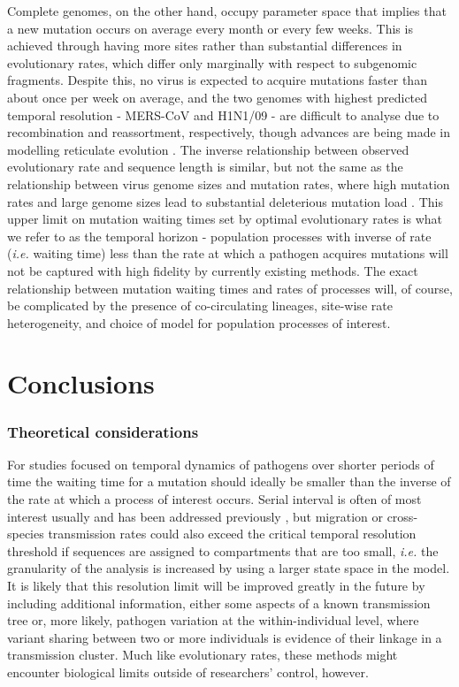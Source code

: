 \documentclass[11pt,oneside,letterpaper]{article}
\begin{document}
Complete genomes, on the other hand, occupy parameter space that implies that a new mutation occurs on average every month or every few weeks.
This is achieved through having more sites rather than substantial differences in evolutionary rates, which differ only marginally with respect to subgenomic fragments.
Despite this, no virus is expected to acquire mutations faster than about once per week on average, and the two genomes with highest predicted temporal resolution - MERS-CoV and H1N1/09 - are difficult to analyse due to recombination and reassortment, respectively, though advances are being made in modelling reticulate evolution \citep{vaughan_inferring_2017}.
The inverse relationship between observed evolutionary rate and sequence length is similar, but not the same as the relationship between virus genome sizes and mutation rates, where high mutation rates and large genome sizes lead to substantial deleterious mutation load \citep{pybus_phylogenetic_2007,gago_extremely_2009}.
This upper limit on mutation waiting times set by optimal evolutionary rates is what we refer to as the temporal horizon - population processes with inverse of rate (\textit{i.e.} waiting time) less than the rate at which a pathogen acquires mutations will not be captured with high fidelity by currently existing methods.
The exact relationship between mutation waiting times and rates of processes will, of course, be complicated by the presence of co-circulating lineages, site-wise rate heterogeneity, and choice of model for population processes of interest.

\section*{Conclusions}
\subsubsection*{Theoretical considerations}
For studies focused on temporal dynamics of pathogens over shorter periods of time the waiting time for a mutation should ideally be smaller than the inverse of the rate at which a process of interest occurs.
Serial interval is often of most interest usually and has been addressed previously \citep{campbell_when_2018,grubaugh_tracking_2019}, but migration or cross-species transmission rates could also exceed the critical temporal resolution threshold if sequences are assigned to compartments that are too small, \textit{i.e.} the granularity of the analysis is increased by using a larger state space in the model.
It is likely that this resolution limit will be improved greatly in the future by including additional information, either some aspects of a known transmission tree or, more likely, pathogen variation at the within-individual level, where variant sharing between two or more individuals is evidence of their linkage in a transmission cluster.
Much like evolutionary rates, these methods might encounter biological limits outside of researchers' control, however.
\end{document}
